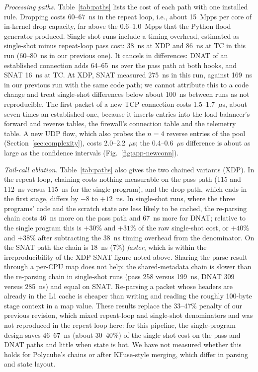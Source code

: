 \documentclass[conference]{IEEEtran}
\begin{document}
\textit{Processing paths.} Table~\ref{tab:paths} lists the cost of each path
with one installed rule. Dropping costs 60--67~ns in the repeat loop,
i.e., about 15~Mpps per core of in-kernel drop capacity, far above the
0.6--1.0~Mpps that the Python flood generator produced. Single-shot runs
include a timing overhead, estimated as single-shot minus repeat-loop pass
cost: 38~ns at XDP and 86~ns at TC in this run (60--80~ns in our previous
one). It cancels in differences: DNAT of an established connection adds
64--65~ns over the pass path at both hooks, and SNAT 16~ns at TC. At XDP, SNAT
measured 275~ns in this run, against 169~ns in our previous run with the
same code path; we cannot attribute this to a code change and treat
single-shot differences below about 100~ns between runs as not reproducible.
The first packet of a new TCP connection costs 1.5--1.7~$\mu$s, about seven
times an established one, because it inserts entries into the load
balancer's forward and reverse tables, the firewall's connection table and
the telemetry table. A new UDP flow, which also probes the $n=4$ reverse
entries of the pool (Section~\ref{sec:complexity}), costs 2.0--2.2~$\mu$s;
the 0.4--0.6~$\mu$s difference is about as large as the confidence
intervals (Fig.~\ref{fig:app-newconn}).

\textit{Tail-call ablation.} Table~\ref{tab:paths} also gives the two chained
variants (XDP). In the repeat loop, chaining costs nothing measurable on the
pass path (115 and 112~ns versus 115~ns for the single program), and the
drop path, which ends in the first stage, differs by $-8$ to $+12$~ns. In
single-shot runs, where the three programs' code and the scratch state are
less likely to be cached, the re-parsing chain costs 46~ns more on the pass
path and 67~ns more for DNAT; relative to the single program this is $+30\%$
and $+31\%$ of the raw single-shot cost, or $+40\%$ and $+38\%$ after
subtracting the 38~ns timing overhead from the denominator. On the SNAT path
the chain is 18~ns ($7\%$) \emph{faster}, which is within the
irreproducibility of the XDP SNAT figure noted above. Sharing the parse
result through a per-CPU map does not help: the shared-metadata chain is
slower than the re-parsing chain in single-shot runs (pass 258 versus
199~ns, DNAT 309 versus 285~ns) and equal on SNAT. Re-parsing a packet whose
headers are already in the L1 cache is cheaper than writing and reading the
roughly 100-byte stage context in a map value. These results replace the
33--47\% penalty of our previous revision, which mixed repeat-loop and
single-shot denominators and was not reproduced in the repeat loop here: for
this pipeline, the single-program design saves 46--67~ns (about 30--40\%) of
the single-shot cost on the pass and DNAT paths and little when state is
hot. We have not measured whether this holds for Polycube's chains or after
KFuse-style merging, which differ in parsing and state layout.
\end{document}
